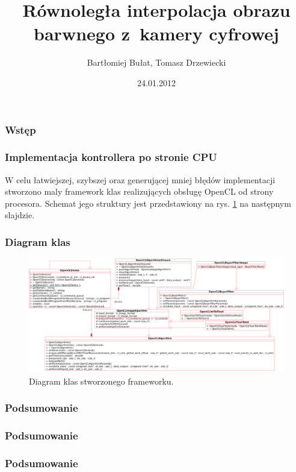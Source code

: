 \documentclass{beamer}
\title[Interpolacja obrazu barwnego]{Równoległa interpolacja obrazu barwnego
  z~kamery cyfrowej}
\author[B. Bułat, T. Drzewiecki]{Bartłomiej Bułat, Tomasz Drzewiecki}
\date[2011]{24.01.2012}
\institute[AGH]
{Wydział EAIiIB\\ 
Katedra Automatyki i Inżynierii Biomedycznej
}
\begin{document}
{
 \begin{frame}
   \titlepage
 \end{frame}
}



\begin{frame}
\frametitle{Wstęp}

\end{frame}

\begin{frame}
  \frametitle{Implementacja kontrollera po stronie CPU}
  W celu łatwiejszej, szybszej oraz generującej mniej błędów implementacji stworzono maly framework klas realizujących obsługę OpenCL od strony procesora.
Schemat jego struktury jest przedstawiony na rys. \ref{fig:class_diagram} na następnym slajdzie.
\end{frame}

\begin{frame}
  \frametitle{Diagram klas}
\begin{figure}
  \centering
  \includegraphics[width=0.6\linewidth]{class_diagram}
  \caption{Diagram klas stworzonego frameworku.}
  \label{fig:class_diagram}
\end{figure}
  
\end{frame}

\begin{frame}
  \frametitle{Podsumowanie}
  
\end{frame}
\begin{frame}
  \frametitle{Podsumowanie}
  
\end{frame}
\begin{frame}
  \frametitle{Podsumowanie}
  
\end{frame}
\end{document}

